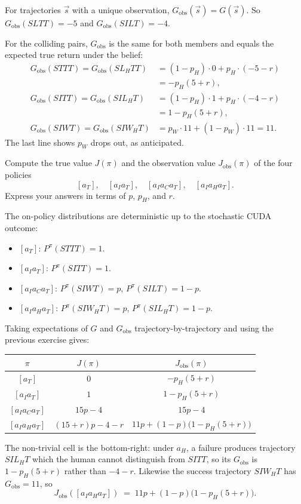 \documentclass[11pt]{article}
\newcommand{\Gobs}{G_{\mathrm{obs}}}
\newcommand{\Jobs}{J_{\mathrm{obs}}}
\begin{document}
\begin{solution}
For trajectories $\vec s$ with a unique observation, $\Gobs(\vec s) = G(\vec s)$. So
$\Gobs(SLTT) = -5$ and $\Gobs(SILT) = -4$.

For the colliding pairs, $\Gobs$ is the same for both members and equals the
expected true return under the belief:
\begin{align*}
\Gobs(STTT) = \Gobs(SL_HTT) &= (1-p_H)\cdot 0 + p_H \cdot (-5-r) \\
&= -p_H(5+r), \\
\Gobs(SITT) = \Gobs(SIL_HT) &= (1-p_H)\cdot 1 + p_H\cdot(-4-r) \\
&= 1 - p_H(5+r), \\
\Gobs(SIWT) = \Gobs(SIW_HT) &= p_W \cdot 11 + (1-p_W)\cdot 11 = 11.
\end{align*}
The last line shows $p_W$ drops out, as anticipated.
\end{solution}


\begin{exercise}
\label{prob:policyvalues}
Compute the true value $J(\pi)$
and the observation value $\Jobs(\pi)$ of the four policies
$$
[a_T],\quad [a_I a_T],\quad [a_I a_C a_T],\quad [a_I a_H a_T].
$$
Express your answers in terms of $p$, $p_H$, and $r$.
\end{exercise}

\begin{solution}
The on-policy distributions are deterministic up to the stochastic CUDA
outcome:
\begin{itemize}
    \item $[a_T]$: $P^\pi(STTT) = 1$.
    \item $[a_I a_T]$: $P^\pi(SITT) = 1$.
    \item $[a_I a_C a_T]$: $P^\pi(SIWT) = p$, $P^\pi(SILT) = 1-p$.
    \item $[a_I a_H a_T]$: $P^\pi(SIW_HT) = p$, $P^\pi(SIL_HT) = 1-p$.
\end{itemize}
Taking expectations of $G$ and $\Gobs$ trajectory-by-trajectory and using the previous exercise gives:
\begin{center}
\begin{tabular}{c|c|c}
$\pi$              & $J(\pi)$           & $\Jobs(\pi)$ \\\hline
$[a_T]$            & $0$                & $-p_H(5+r)$ \\
$[a_I a_T]$        & $1$                & $1 - p_H(5+r)$ \\
$[a_I a_C a_T]$    & $15p - 4$          & $15p - 4$ \\
$[a_I a_H a_T]$    & $(15+r)p - 4 - r$  & $11p + (1-p)\bigl(1 - p_H(5+r)\bigr)$
\end{tabular}
\end{center}
The non-trivial cell is the bottom-right: under $a_H$, a failure produces
trajectory $SIL_HT$ which the human cannot distinguish from $SITT$, so its
$\Gobs$ is $1 - p_H(5+r)$ rather than $-4-r$. Likewise the success
trajectory $SIW_HT$ has $\Gobs = 11$, so
$$
\Jobs([a_I a_H a_T]) \;=\; 11p + (1-p)\bigl(1 - p_H(5+r)\bigr).
$$
\end{solution}
\end{document}
